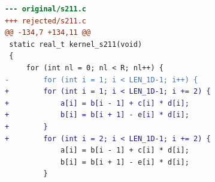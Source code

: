 \begin{lstlisting}[language=diff,basicstyle=\ttfamily\scriptsize,breaklines=true,caption={tsvc/s211 — attempt 1 of 4, rejected by the gate at 'correctness': Program output changed — the patched program is NOT semantically equivalent to the original. / output differs and no numerical slack is in effect}]
--- original/s211.c
+++ rejected/s211.c
@@ -134,7 +134,11 @@
 static real_t kernel_s211(void)
 {
     for (int nl = 0; nl < R; nl++) {
-        for (int i = 1; i < LEN_1D-1; i++) {
+        for (int i = 1; i < LEN_1D-1; i += 2) {
+            a[i] = b[i - 1] + c[i] * d[i];
+            b[i] = b[i + 1] - e[i] * d[i];
+        }
+        for (int i = 2; i < LEN_1D-1; i += 2) {
             a[i] = b[i - 1] + c[i] * d[i];
             b[i] = b[i + 1] - e[i] * d[i];
         }
\end{lstlisting}
